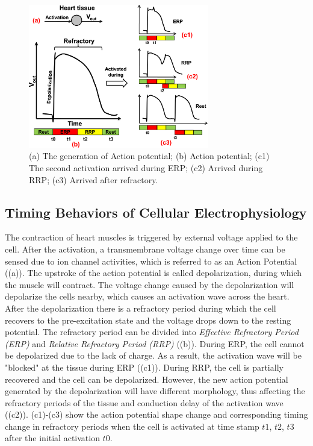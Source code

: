\begin{figure}[!t]
\center
\includegraphics[width=0.7\textwidth]{figs/refractory.png}
\caption{(a) The generation of Action potential; (b) Action potential; (c1) The second activation arrived during ERP; (c2) Arrived during RRP; (c3) Arrived after refractory.}
\label{fig:refractory}
\end{figure} 
\subsection{Timing Behaviors of Cellular Electrophysiology}
The contraction of heart muscles is triggered by external voltage applied to the cell. After the activation, a transmembrane voltage change over time can be sensed due to ion channel activities, which is referred to as an Action Potential ((a)). The upstroke of the action potential is called depolarization, during which the muscle will contract. The voltage change caused by the depolarization will depolarize the cells nearby, which causes an activation wave across the heart. After the depolarization there is a refractory period during which the cell recovers to the pre-excitation state and the voltage drops down to the resting potential. The refractory period can be divided into \emph{Effective Refractory Period (ERP)} and \emph{Relative Refractory Period (RRP)} ((b)). During ERP, the cell cannot be depolarized due to the lack of charge. As a result, the activation wave will be "blocked" at the tissue during ERP ((c1)). During RRP, the cell is partially recovered and the cell can be depolarized. However, the new action potential generated by the depolarization will have different morphology, thus affecting the refractory periods of the tissue and conduction delay of the activation wave ((c2)). (c1)-(c3) show the action potential shape change and corresponding timing change in refractory periods when the cell is activated at time stamp $t1$, $t2$, $t3$ after the initial activation $t0$. 

